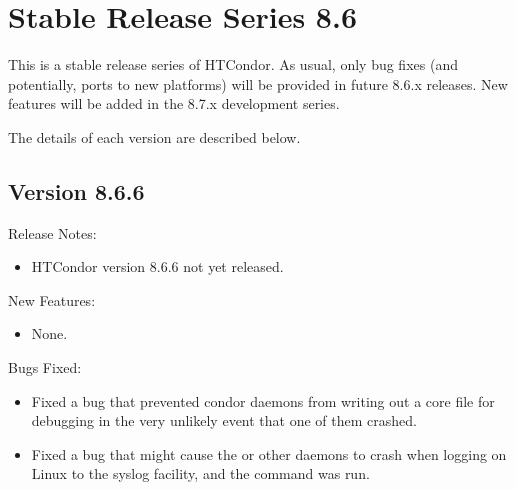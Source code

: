 
\section{\label{sec:History-8-6}Stable Release Series 8.6}

This is a stable release series of HTCondor.
As usual, only bug fixes (and potentially, ports to new platforms)
will be provided in future 8.6.x releases.
New features will be added in the 8.7.x development series.

The details of each version are described below.

\subsection*{\label{sec:New-8-6-6}Version 8.6.6}

\noindent Release Notes:

\begin{itemize}

\item HTCondor version 8.6.6 not yet released.

\end{itemize}


\noindent New Features:

\begin{itemize}

\item None.

\end{itemize}

\noindent Bugs Fixed:

\begin{itemize}

\item Fixed a bug that prevented condor daemons from writing out a
core file for debugging in the very unlikely event that one of them
crashed.

\item Fixed a bug that might cause the  or other daemons to
crash when logging on Linux to the syslog facility, and the 
command was run.

\end{itemize}

